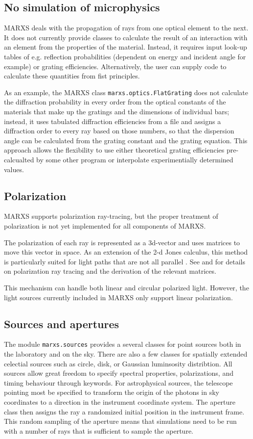 \documentclass[twocolumn]{aastex61}
\begin{document}
\subsection{No simulation of microphysics}
MARXS deals with the propagation of rays from one optical element to the
next. It does not currently provide classes to calculate the result of an
interaction with an element from the properties of the material. Instead, it
requires input look-up tables of e.g. reflection probabilities (dependent on
energy and incident angle for example) or grating efficiencies. Alternatively,
the user can supply code to calculate these quantities from fist principles.

As an example, the MARXS class \texttt{marxs.optics.FlatGrating} does not
calculate the diffraction probability in every order from the optical constants
of the materials that make up the gratings and the dimensions of individual
bars; instead, it uses tabulated diffraction efficiencies from a file and
assigns a diffraction order to every ray based on those numbers, so that the
dispersion angle can be calculated from the grating constant and the grating
equation. This approach allows the flexibility to use either theoretical
grating efficiencies pre-calcualted by some other program or interpolate
experimentially determined values.


\subsection{Polarization}
MARXS supports polarization ray-tracing, but the proper treatment of
polarization is not yet implemented for all components of MARXS.

The polarization of each ray is represented as a 3d-vector and uses matrices to
move this vector in space. As an extension of the 2-d Jones calculus, this
method is particularly suited for light paths that are not all parallel
\citep{doi:10.1117/12.138816}. See \citet{Yun:11} and \citet{Yunthesis} for
details on polarization ray tracing and the derivation of the relevant
matrices.

This mechanism can handle both linear and circular polarized light. However,
the light sources currently included in MARXS only support linear polarization.


\subsection{Sources and apertures}
The module \texttt{marxs.sources} provides a several classes for point sources
both in the laboratory and on the sky. There are also a few classes for
spatially extended celectial sources such as circle, disk, or Gaussian
luminsosity distribtion. All sources allow great freedom to specify spectral
properties, polarizations, and timing behaviour through keywords. For
astrophysical sources, the telescope pointing most be specified to transform
the origin of the photons in sky coordinates to a direction in the instrument
coordinate system. The aperture class then assigns the ray a randomized initial
position in the instrument frame. This random sampling of the aperture means
that simulations need to be run with a number of rays that is sufficient to
sample the aperture.
\end{document}

